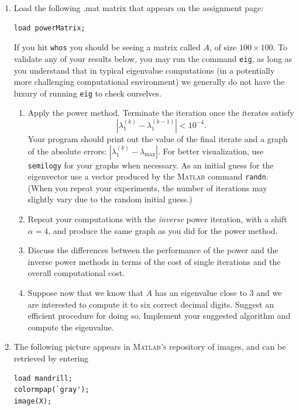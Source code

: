 \documentclass[11pt]{article}
\begin{document}
\begin{enumerate}
\item Load the following .mat matrix that appears on the assignment page:
\begin{verbatim}
load powerMatrix;
\end{verbatim}
If you hit {\tt whos} you should be seeing a matrix called $A$, of size $100 \times 100$. To validate any of your results below, you may run the {} command {\tt eig}, as long as you understand that in typical eigenvalue computations (in a potentially more challenging computational environment) we generally do not have the luxury of running  {\tt eig} to check ourselves. 
\begin{enumerate}
\item Apply the power method. Terminate the iteration once the iterates satisfy
$$|\lambda_1^{(k)}-\lambda_1^{(k-1)}| < 10^{-4}.$$ Your program should
print out the value of the final iterate and a graph of the absolute errors:
$| \lambda_1^{(k)}-\lambda_{\max}|$. For better visualization, use {\tt semilogy}  for your graphs
when necessary. As an
initial guess for the eigenvector use a vector produced by the
\textsc{Matlab} command {\tt randn}. (When you repeat your experiments, the number of iterations may slightly vary due to the random initial guess.)
\item Repeat your computations with the {\em inverse} power
iteration, with a shift $\alpha=4$, and produce the same graph as
you did for the power method.
\item Discuss the differences between the performance of
the power and the inverse power methods in terms of the cost of single iterations and the overall 
computational cost.
\item Suppose now that we know that $A$ has an eigenvalue close to 3 and we are interested to compute it to six correct decimal digits. Suggest an efficient procedure for doing so. Implement your suggested algorithm and compute the eigenvalue.
\end{enumerate}

\item The following picture appears in \textsc{Matlab's}
repository of images, and can be retrieved by entering 
\begin{verbatim}
load mandrill;
colormpap(`gray');
image(X);
\end{verbatim}


\end{enumerate}
\end{document}
